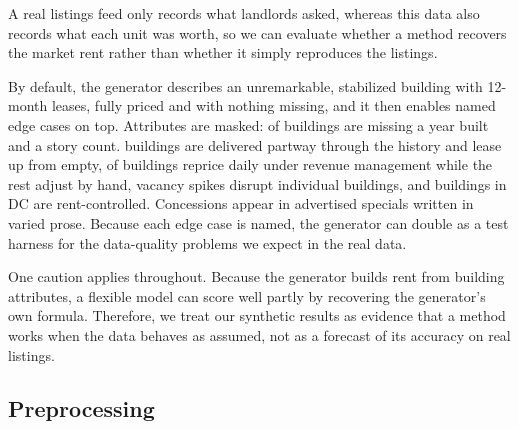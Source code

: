 A real listings feed only
records what landlords asked, whereas this data also records what each unit was worth, so we can
evaluate whether a method recovers the market rent rather than whether it simply reproduces the
listings.

By default, the generator describes an unremarkable, stabilized building with 12-month leases, fully
priced and with nothing missing, and it then enables named edge cases on top. Attributes are masked:
\yearBuiltMasked{} of buildings are missing a year built and \storiesMasked{} a story count.
\nLeaseUp{} buildings are delivered partway through the history and lease up from empty,
\rmShare{} of buildings reprice daily under revenue management while the rest adjust by hand,
\nVacancySpikes{} vacancy spikes disrupt individual buildings, and \nRentControlled{} buildings in DC
are rent-controlled. Concessions appear in \nConcessionEvents{} advertised specials written in
varied prose. Because each edge case is named, the generator can double as a test harness for the
data-quality problems we expect in the real data.

One caution applies throughout. Because the generator builds rent from building attributes, a
flexible model can score well partly by recovering the generator's own formula. Therefore, we treat
our synthetic results as evidence that a method works when the data behaves as assumed, not as a
forecast of its accuracy on real listings.


\subsection{Preprocessing}\label{sec:preprocessing}

